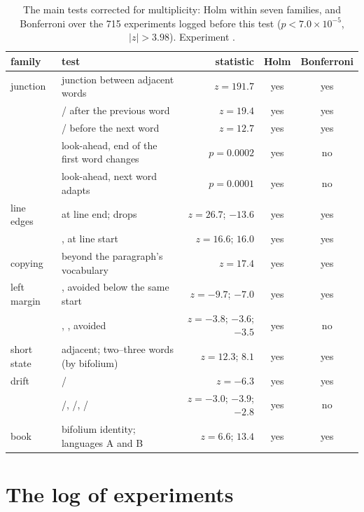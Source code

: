 \begin{table}[htbp]
\centering\footnotesize
\caption{The main tests corrected for multiplicity: Holm within seven families, and Bonferroni over the 715 experiments
logged before this test ($p < 7.0\times10^{-5}$, $|z| > 3.98$). Experiment .}
\label{tab:multiplicity}
\begin{tabularx}{\linewidth}{>{\raggedright\arraybackslash}p{2.8cm}Yrcc}
\toprule
family & test & statistic & Holm & Bonferroni \\
\midrule
junction & junction between adjacent words & $z = 191.7$ & yes & yes \\
 & / after the previous word & $z = 19.4$ & yes & yes \\
 & / before the next word & $z = 12.7$ & yes & yes \\
 & look-ahead, end of the first word changes & $p = 0.0002$ & yes & no \\
 & look-ahead, next word adapts & $p = 0.0001$ & yes & no \\
line edges &  at line end;  drops & $z = 26.7$; $-13.6$ & yes & yes \\
 & ,  at line start & $z = 16.6$; $16.0$ & yes & yes \\
copying & beyond the paragraph's vocabulary & $z = 17.4$ & yes & yes \\
left margin & ,  avoided below the same start & $z = -9.7$; $-7.0$ & yes & yes \\
 & , ,  avoided & $z = -3.8$; $-3.6$; $-3.5$ & yes & no \\
short state & adjacent; two--three words (by bifolium) & $z = 12.3$; $8.1$ & yes & yes \\
drift & / & $z = -6.3$ & yes & yes \\
 & /, /, / & $z = -3.0$; $-3.9$; $-2.8$ & yes & no \\
book & bifolium identity; languages A and B & $z = 6.6$; $13.4$ & yes & yes \\
\bottomrule
\end{tabularx}
\end{table}

\section{The log of experiments}
\label{app:log}

